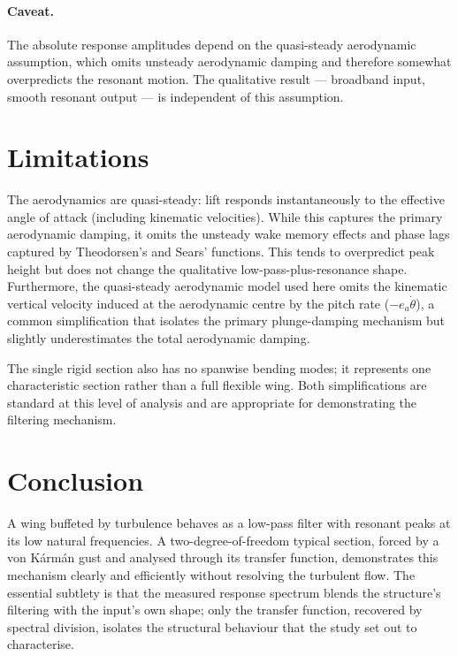 \documentclass[11pt]{article}
\begin{document}
\paragraph{Caveat.} The absolute response amplitudes depend on the quasi-steady aerodynamic
assumption, which omits unsteady aerodynamic damping and therefore somewhat overpredicts the
resonant motion. The qualitative result --- broadband input, smooth resonant output --- is
independent of this assumption.

\section{Limitations}
The aerodynamics are quasi-steady: lift responds instantaneously to the effective angle of attack 
(including kinematic velocities). While this captures the primary aerodynamic damping, 
it omits the unsteady wake memory effects and phase lags captured by Theodorsen's and Sears' functions. This tends to overpredict peak height but does not change the qualitative low-pass-plus-resonance
shape. Furthermore, the quasi-steady aerodynamic model used here omits the kinematic vertical velocity induced at the aerodynamic centre by the pitch rate ($-e_a \dot{\theta}$), a common simplification that isolates the primary plunge-damping mechanism but slightly underestimates the total aerodynamic damping.

The single rigid section also has no spanwise bending modes; it represents one
characteristic section rather than a full flexible wing. Both simplifications are standard at
this level of analysis and are appropriate for demonstrating the filtering mechanism.

\section{Conclusion}
A wing buffeted by turbulence behaves as a low-pass filter with resonant peaks
at its low natural frequencies. A two-degree-of-freedom typical section, forced
by a von K\'arm\'an gust and analysed through its transfer function,
demonstrates this mechanism clearly and efficiently without resolving the turbulent flow. The essential subtlety is that the measured response spectrum blends the
structure's filtering with the input's own shape; only the transfer function,
recovered by spectral division, isolates the structural behaviour that the study
set out to characterise.
\end{document}
